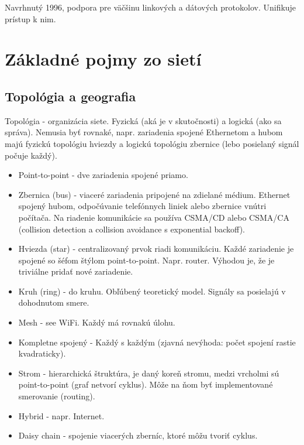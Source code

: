 \documentclass[10pt,a4paper]{article}
\begin{document}
Navrhnutý 1996, podpora pre väčšinu linkových a dátových protokolov. Unifikuje prístup k nim. 

\section{Základné pojmy zo sietí}    
\subsection{Topológia a geografia} 
Topológia - organizácia siete. Fyzická (aká je v skutočnosti) a logická (ako sa správa). Nemusia byť rovnaké, napr. zariadenia spojené Ethernetom a hubom majú fyzickú topológiu hviezdy a logickú topológiu zbernice (lebo posielaný signál počuje každý).  
\begin{itemize}
\item Point-to-point - dve zariadenia spojené priamo.         
\item Zbernica (bus) - viaceré zariadenia pripojené na zdielané médium. Ethernet spojený hubom, odpočúvanie telefónnych liniek alebo zbernice vnútri počítača. Na riadenie komunikácie sa používa CSMA/CD alebo CSMA/CA (collision detection a collision avoidance s exponential backoff).
\item Hviezda (star) - centralizovaný prvok riadi komunikáciu. Každé zariadenie je spojené so šéfom štýlom point-to-point. Napr. router.  Výhodou je, že je triviálne pridať nové zariadenie. 
\item Kruh (ring) - do kruhu. Obľúbený teoretický model. Signály sa posielajú v dohodnutom smere. 
\item Mesh - see WiFi. Každý má rovnakú úlohu. 
\item Kompletne spojený - Každý s každým (zjavná nevýhoda: počet spojení rastie kvadraticky). 
\item Strom - hierarchická štruktúra, je daný koreň stromu, medzi vrcholmi sú point-to-point (graf netvorí cyklus). Môže na ňom byť implementované smerovanie (routing). 
\item Hybrid - napr. Internet. 
\item Daisy chain - spojenie viacerých zberníc, ktoré môžu tvoriť cyklus. 
\end{itemize}
\end{document}
